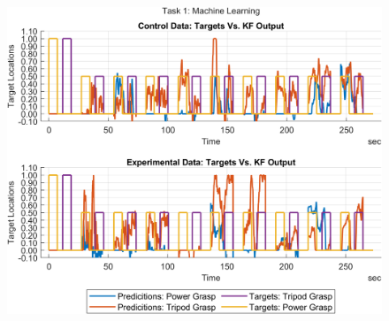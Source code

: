\documentclass[12pt]{article}
\newcommand\figWidthLarge{9.5in}
\begin{document}
    \begin{landscape}
    \begin{figure}
        \includegraphics[width = \figWidthLarge]{t1-kf-out.png}
    \end{figure}
    \end{landscape}
    \newpage \clearpage
    
\end{document}
